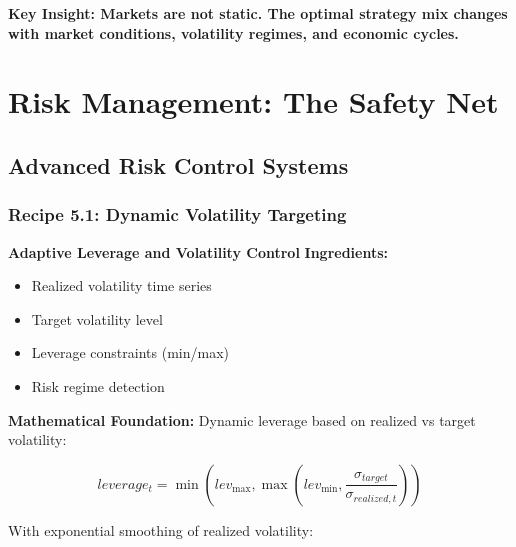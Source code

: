 \documentclass[11pt,letterpaper,openany]{book}
\begin{document}
\textbf{Key Insight: Markets are not static. The optimal strategy mix changes with market conditions, volatility regimes, and economic cycles.}

\chapter{Risk Management: The Safety Net}

\section{Advanced Risk Control Systems}

\subsection{Recipe 5.1: Dynamic Volatility Targeting}

\textbf{Adaptive Leverage and Volatility Control}
\textbf{Ingredients:}
\begin{itemize}
    \item Realized volatility time series
    \item Target volatility level
    \item Leverage constraints (min/max)
    \item Risk regime detection
\end{itemize}
\textbf{Mathematical Foundation:}
Dynamic leverage based on realized vs target volatility:

\begin{equation}
leverage_t = \min\left(lev_{\max}, \max\left(lev_{\min}, \frac{\sigma_{target}}{\sigma_{realized,t}}\right)\right)
\end{equation}

With exponential smoothing of realized volatility:
\end{document}
